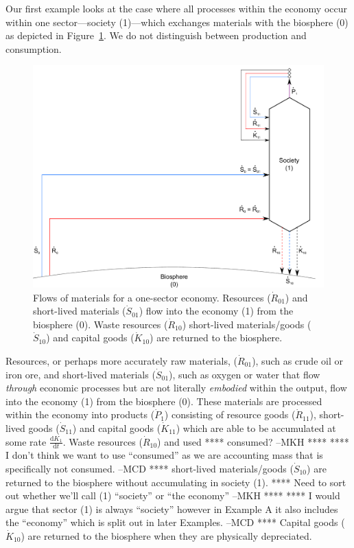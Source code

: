 Our first example looks at the case where all processes within the economy occur within
one sector---society (1)---which exchanges materials with the biosphere (0) as depicted in
Figure~\ref{fig:A_materials}.  We do not distinguish between production and consumption.

\begin{figure}[!ht]
\centering{}
\includegraphics[width=0.8\linewidth]{Part_1/Chapter_Materials/images/1_sector_materials.pdf}
\caption[Flows of materials for a one-sector economy]{Flows of materials 
for a one-sector economy. 
Resources ($\dot{R}_{01}$) and short-lived materials 
($\dot{S}_{01}$) flow into the economy (1) 
from the biosphere (0). Waste resources 
($\dot{R}_{10}$) short-lived materials/goods 
($\dot{S}_{10}$) and capital goods 
($\dot{K}_{10}$) are returned to the biosphere.}
\label{fig:A_materials}
\end{figure}

Resources, or perhaps more accurately raw materials, 
($\dot{R}_{01}$), such as crude oil or iron ore, 
and short-lived materials ($\dot{S}_{01}$), 
such as oxygen or water that flow \emph{through} economic
processes but are not literally \emph{embodied} within the output, 
flow into the economy (1) from the biosphere (0). 
These materials are processed within the economy into products ($\dot{P}_{1}$) 
consisting of resource goods ($\dot{R}_{11}$), 
short-lived goods ($\dot{S}_{11}$) and capital 
goods ($\dot{K}_{11}$)
which are able to be accumulated at some rate 
$\frac{\mathrm{d}K_{1}}{\mathrm{d}t}$.
Waste resources ($\dot{R}_{10}$) and used **** consumed? --MKH **** 
**** I don't think we want to use ``consumed'' as we are accounting
mass that is specifically not consumed. --MCD ****
short-lived materials/goods ($\dot{S}_{10}$)
are returned to the biosphere without 
accumulating in society (1). **** Need to sort out whether we'll call (1)
``society'' or ``the economy'' --MKH **** 
**** I would argue that sector (1) is always ``society''
however in Example A it also includes the ``economy'' which is
split out in later Examples. --MCD ****
Capital goods ($\dot{K}_{10}$) 
are returned to the biosphere 
when they are physically depreciated.

